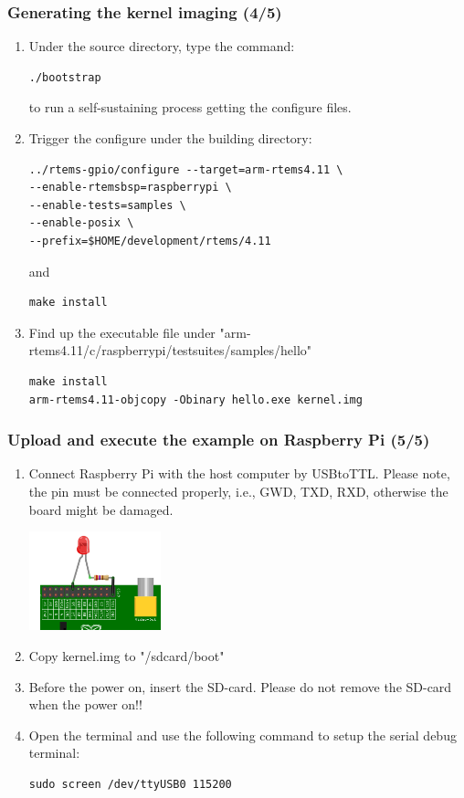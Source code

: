 \documentclass[t]{beamer}
\begin{document}
\begin{frame}[fragile]
\frametitle{Generating the kernel imaging (4/5)}
\begin{enumerate}
\item Under the source directory, type the command:
\begin{verbatim}
./bootstrap 
\end{verbatim}  
to run a self-sustaining process getting the configure files.
\item Trigger the configure under the building directory:
\begin{verbatim}
../rtems-gpio/configure --target=arm-rtems4.11 \
--enable-rtemsbsp=raspberrypi \
--enable-tests=samples \
--enable-posix \
--prefix=$HOME/development/rtems/4.11
\end{verbatim}   
and 
\begin{verbatim}
make install
\end{verbatim}   
\item Find up the executable file under "arm-rtems4.11/c/raspberrypi/testsuites/samples/hello"
\begin{verbatim}
make install
arm-rtems4.11-objcopy -Obinary hello.exe kernel.img
\end{verbatim}  
\end{enumerate}
\end{frame}
\begin{frame}[fragile]
\frametitle{Upload and execute the example on Raspberry Pi (5/5)}
\begin{enumerate}
\item Connect Raspberry Pi with the host computer by USBtoTTL. Please note, the pin must be connected properly, i.e., GWD, TXD, RXD, otherwise the board might be damaged.
\begin{center}
\includegraphics[width=0.3\textwidth]{gpio-led}
\end{center}
\item Copy kernel.img to "/sdcard/boot"
\item Before the power on, insert the SD-card. Please do not remove the SD-card when the power on!!
\item Open the terminal and use the following command to setup the serial debug terminal:
\begin{verbatim}
sudo screen /dev/ttyUSB0 115200
\end{verbatim}   

\end{enumerate}
\end{frame}
\end{document}
